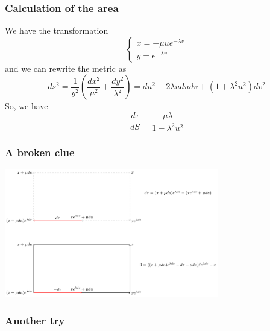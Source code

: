 \documentclass[aspectratio=169]{beamer}
\begin{document}
\begin{frame}
    \frametitle{Calculation of the area}
    We have the transformation
    \[
        \begin{cases}
        x = - \mu u e^{- \lambda v} \\
        y = e^{- \lambda v}
        \end{cases}
    \]
    and we can rewrite the metric as
    \[
        ds^2 = \frac{1}{y^2}(\frac{dx^2}{\mu^2} + \frac{dy^2}{\lambda^2}) = du^2 - 2 \lambda u du dv + (1 + \lambda^2 u^2) dv^2
    \]
    So, we have
    \begin{equation}
        \frac{d\tau}{dS} = \frac{\mu \lambda}{1 - \lambda^2 u^2}
    \end{equation}

\end{frame}

\begin{frame}
    \frametitle{A broken clue}
    \begin{center}
        \includegraphics[width=0.7\textwidth]{../images/19-curl}
    \end{center}
\end{frame}

\begin{frame}
    \frametitle{Another try}
\end{frame}
\end{document}
